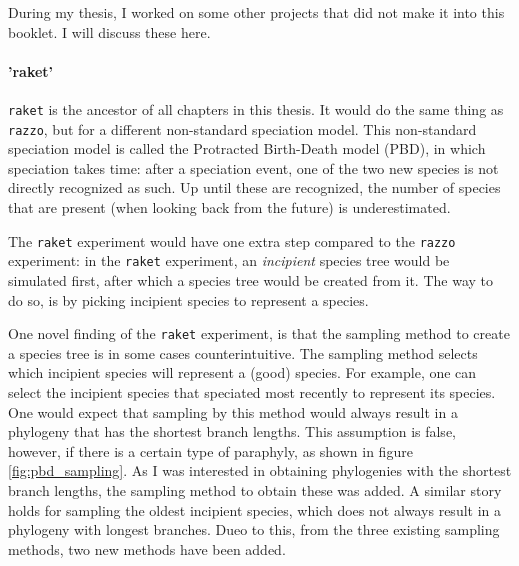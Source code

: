 During my thesis, I worked on some other projects that did not make
it into this booklet. I will discuss these here.

\paragraph{'raket'} 

\verb;raket; is the ancestor of all chapters in this thesis.
It would do the same thing as \verb;razzo;, but for a different non-standard 
speciation model. This non-standard speciation model is
called the Protracted Birth-Death model (PBD), in which speciation
takes time: after a speciation event, one of the two new species is not
directly recognized as such. Up until these are recognized, the number
of species that are present (when looking back from the future) 
is underestimated.

The \verb;raket; experiment would have one extra step compared to the \verb;razzo;
experiment: in the \verb;raket; experiment, an \emph{incipient} species tree
would be simulated first, after which a species tree would be created
from it. The way to do so, is by picking incipient species to represent
a species.

One novel finding of the \verb;raket; experiment, is that the sampling
method to create a species tree is in some cases counterintuitive.
The sampling method selects which incipient species 
will represent a (good) species. For example, one can select the
incipient species that speciated most recently to represent its
species. One would expect that sampling by this method would
always result in a phylogeny that has the shortest branch lengths.
This assumption is false, however, if there is a certain type of
paraphyly, as shown in figure \ref{fig:pbd_sampling}. 
As I was interested in obtaining phylogenies with the
shortest branch lengths, the sampling method to obtain 
these was added. A similar story holds for sampling the oldest 
incipient species, which does not always result in a phylogeny with
longest branches. Dueo to this, 
from the three existing sampling methods, 
two new methods have been added.

